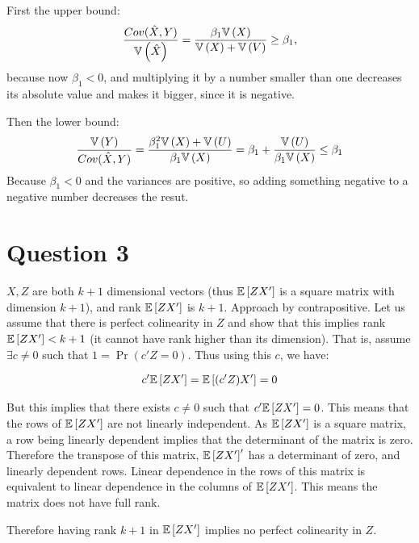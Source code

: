 \documentclass[12pt]{paper}
\begin{document}
First the upper bound:
\begin{equation*}
  \frac{Cov( \hat{X}, Y)}{\mathbb{V} \left ( \hat{X} \right )} = \frac{\beta_1 \mathbb{V} \left ( X \right )}{\mathbb{V} \left ( X \right ) + \mathbb{V} \left ( V \right )} \ge \beta_1,
\end{equation*}
because now $\beta_1<0$, and multiplying it by a number smaller than one decreases its absolute value and makes it bigger, since it is negative.

Then the lower bound:
\begin{align*}
  \frac{\mathbb{V} \left ( Y \right )}{Cov( \hat{X}, Y)}=\frac{\beta_1^2 \mathbb{V} \left ( X \right ) + \mathbb{V} \left ( U \right )}{\beta_1 \mathbb{V} \left ( X \right )}=\beta_1+\frac{\mathbb{V} \left ( U \right )}{\beta_1 \mathbb{V} \left ( X \right )}\le \beta_1
\end{align*}
Because $\beta_1<0$ and the variances are positive, so adding something negative to a negative number decreases the resut.


\section*{Question 3}

$X,Z$ are both $k+1$ dimensional vectors (thus $\mathbb{E} \left [ ZX' \right ]$ is a square
matrix with dimension $k+1$), and rank $\mathbb{E} \left [ ZX' \right ]$ is $k+1$. Approach
by contrapositive. Let us assume that there is perfect colinearity in
$Z$ and show that this implies rank $\mathbb{E} \left [ ZX' \right ]< k+1$ (it cannot have
rank higher than its dimension). That is, assume $\exists c \neq 0$ such that
$1 = \Pr ( c' Z = 0)$. Thus using this $c$, we have:

\begin{align*}
  c'\mathbb{E} \left [ ZX' \right ]=\mathbb{E} \left [ (c'Z)X' \right ]=0
\end{align*}

But this implies that there exists $c\ne0$ such that
$c'\mathbb{E} \left [ ZX' \right ]=0$. This means that the rows of $\mathbb{E} \left [ ZX' \right ]$ are not
linearly independent. As $\mathbb{E} \left [ ZX' \right ]$ is a square matrix, a row being
linearly dependent implies that the determinant of the matrix is
zero. Therefore the transpose of this matrix, $\mathbb{E} \left [ ZX' \right ]'$ has a
determinant of zero, and linearly dependent rows. Linear dependence in
the rows of this matrix is equivalent to linear dependence in the
columns of $\mathbb{E} \left [ ZX' \right ]$. This means the matrix does not have full
rank.

Therefore having rank $k+1$ in $\mathbb{E} \left [ ZX' \right ]$ implies no perfect
colinearity in $Z$.
\end{document}
